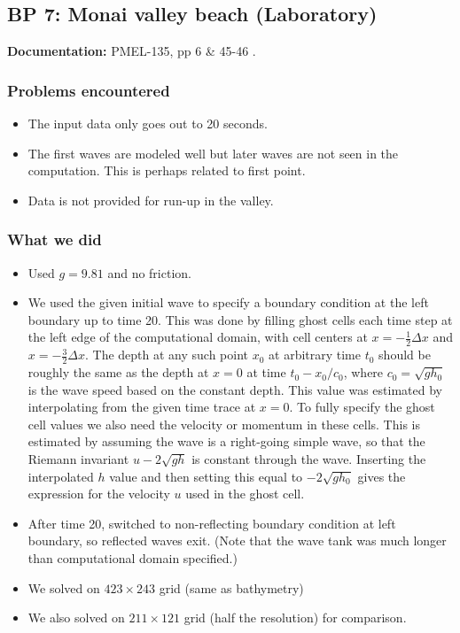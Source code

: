 
\subsection{BP 7:
 Monai valley beach (Laboratory)}

{\bf Documentation:}  PMEL-135, pp 6 \& 45-46
\cite{SynolakisBernard:pmel135}.

\subsubsection{Problems encountered}

\begin{itemize}
\item The input data only goes out to 20 seconds.

\item The first waves are modeled well but later waves are not seen in the
computation.  This is perhaps related to first point.  

\item Data is not provided for run-up in the valley.
\end{itemize}

\subsubsection{What we did}

\begin{itemize}
\item Used $g=9.81$ and no friction.
\item We used the given initial wave to specify a boundary condition at the left
boundary up to time 20.  This was done by filling ghost cells each time step
at the left edge of the computational domain, with cell centers at $x = -
\frac 1 2 \Delta x$ and $x = -\frac 3 2 \Delta x$.
The depth at any such point $x_0$ at arbitrary time $t_0$ should be roughly
the same as the depth at $x=0$ at time $t_0 - x_0/c_0$, where $c_0 =
\sqrt{gh_0}$ is the wave speed based on the constant depth.  This value was
estimated by 
interpolating from the given time trace at $x=0$.
To fully specify the ghost cell values we also need the velocity or momentum
in these cells.  This is estimated by assuming the wave is a right-going
simple wave, so that the Riemann invariant $u - 2\sqrt{gh}$ is constant
through the wave.  Inserting the interpolated $h$ value and then setting this
equal to $-2\sqrt{gh_0}$ gives the expression for the velocity $u$ used in
the ghost cell.

\item After time 20, switched to non-reflecting boundary condition 
at left boundary, so reflected waves exit.  
(Note that the wave tank was much longer than computational domain specified.)
\item We solved on $423\times 243$ grid (same as bathymetry)
\item We also solved on $211\times 121$ grid (half the resolution)
for comparison.
\end{itemize} 

